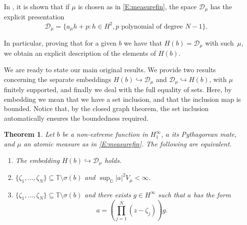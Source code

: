 \documentclass[12pt]{amsart}
\newtheorem{theorem2}{Theorem}
\theoremstyle{definition}
\theoremstyle{remark}
\theoremstyle{remark}
\begin{document}
 In \cite{chacon2013}, it is shown that if $\mu$ is chosen as in \eqref{E:measurefin}, the space $\mathcal{D}_\mu$ has the explicit presentation
 \begin{equation}\label{E:Dmuexplicit}
     \mathcal{D}_\mu = \{a_\mu h + p \colon h\in H^2, p\,\,\text{polynomial of degree}\,\, N-1\}.
 \end{equation}
 
 In particular, proving that for a given $b$ we have that $H(b)=\mathcal{D}_\mu$ with such~$\mu$, we obtain an explicit description of the elements of $H(b)$. 
 
 We are ready to state our main original results. We provide two results concerning the separate embeddings $H(b)\hookrightarrow \mathcal{D}_\mu$ and $\mathcal{D}_\mu \hookrightarrow H(b)$, with
 $\mu$ finitely supported, and finally we deal with the full equality of sets. Here, by embedding we mean that we have a set inclusion, and that the inclusion map is bounded. Notice that, by the closed graph theorem, the set inclusion automatically ensures the boundedness
 required. 
 
\begin{theorem2} \label{T:inclusionmuatom}
     Let $b$ be a non-extreme function in $H^\infty_1$, $a$ its Pythagorean mate, and $\mu$ an atomic measure as in \eqref{E:measurefin}. The following are equivalent.
     \begin{enumerate}[label={\rm (\Alph*)}]
         \item \label{T:inclusionmuatom1} The embedding $H(b) \hookrightarrow \mathcal{D}_\mu$ holds.
         \item \label{T:inclusionmuatom2} $\{\zeta_1,\ldots,\zeta_N\} \subseteq \mathbb{T} \setminus \sigma(b)$ and $\sup_{\mathbb{D}} |a|^2 V_\mu < \infty$.
          \item \label{T:inclusionmuatom4} $\{ \zeta_1, \ldots, \zeta_N \}\subseteq \mathbb{T} \setminus \sigma(b)$ and there exists $g\in H^\infty$ such that $a$ has the form 
         \begin{equation*}
             a=\left(\prod_{j=1}^N (z-\zeta_j)\right) g.
         \end{equation*}
     \end{enumerate}
 \end{theorem2}
\end{document}

